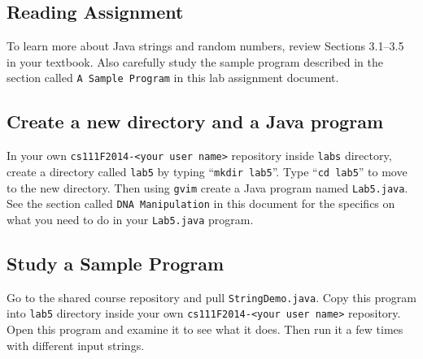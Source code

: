 \subsection*{Reading Assignment}
\vspace{-0.05in}
To learn more about Java strings and random numbers, review Sections 3.1--3.5 in your textbook. Also carefully study the sample program
described in the section called {\tt A Sample Program} in this lab assignment document.

\vspace{-0.05in}
\subsection*{Create a new directory and a Java program}
\vspace{-0.05in}
In your own {\tt cs111F2014-<your user name>} repository inside {\tt labs} directory, create a directory called {\tt lab5} by typing ``{\tt mkdir lab5}''. Type ``{\tt cd lab5}'' to move to the new directory.  Then using {\tt gvim} create a Java program named {\tt Lab5.java}. See the section called {\tt DNA Manipulation} in this document for the specifics on what you need to do in your {\tt Lab5.java} program.

\vspace{-0.05in}
\subsection*{Study a Sample Program}
\vspace{-0.05in}
Go to the shared course repository and pull {\tt StringDemo.java}. Copy this program into {\tt lab5} directory
inside your own {\tt cs111F2014-<your user name>} repository.
Open this program and examine it to see what it does. Then
run it a few times with different input strings.\\

